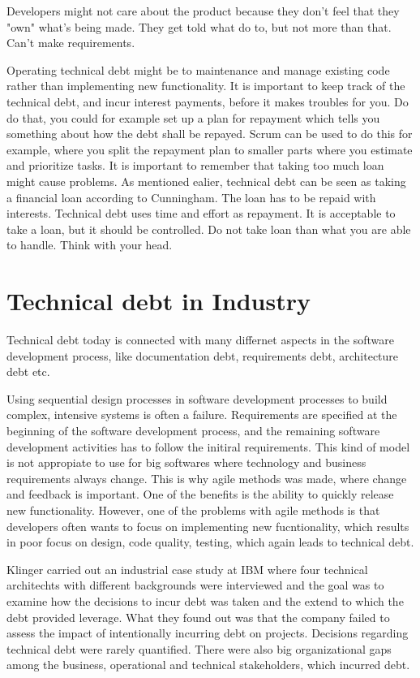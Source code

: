Developers might not care about the product because they don't feel that they "own" what's being made. They get told what do to, but not more than that. Can't make requirements.


Operating technical debt might be to maintenance and manage existing code rather than implementing new functionality. It is important to keep track of the technical debt, and incur interest payments, before it makes troubles for you. Do do that, you could for example set up a plan for repayment which tells you something about how the debt shall be repayed. Scrum can be used to do this for example, where you split the repayment plan to smaller parts where you estimate and prioritize tasks. It is important to remember that taking too much loan might cause problems. As mentioned ealier, technical debt can be seen as taking a financial loan according to Cunningham. The loan has to be repaid with interests. Technical debt uses time and effort as repayment. It is acceptable to take a loan, but it should be controlled. Do not take loan than what you are able to handle. Think with your head.



\section{Technical debt in Industry}
Technical debt today is connected with many differnet aspects in the software development process, like documentation debt, requirements debt, architecture debt etc. 

Using sequential design processes in software development processes to build complex, intensive systems is often a failure. Requirements are specified at the beginning of the software development process, and the remaining software development activities has to follow the initiral requirements. This kind of model is not appropiate to use for big softwares where technology and business requirements always change. This is why agile methods was made, where change and feedback is important. One of the benefits is the ability to quickly release new functionality. However, one of the problems with agile methods is that developers often wants to focus on implementing new fucntionality, which results in poor focus on design, code quality, testing, which again leads to technical debt.  

Klinger carried out an industrial case study at IBM where four technical architechts with different backgrounds were interviewed and the goal was to examine how the decisions to incur debt was taken and the extend to which the debt provided leverage. What they found out was that the company failed to assess the impact of intentionally incurring debt on projects. Decisions regarding technical debt were rarely quantified. There were also big organizational gaps among the business, operational and technical stakeholders, which incurred debt.

